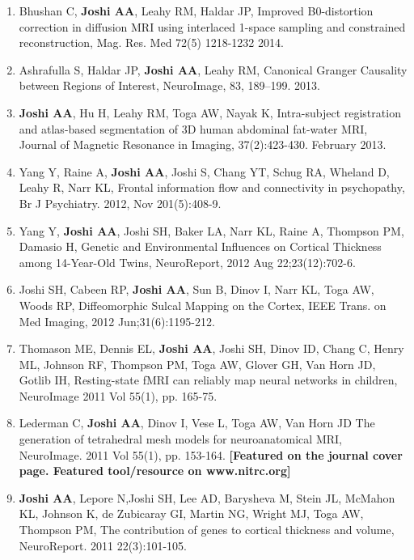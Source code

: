 \documentclass[overlapped,line,letterpaper]{res}
\begin{document}
\begin{resume}
\begin{enumerate}
    \item Bhushan C, \textbf{Joshi AA}, Leahy RM, Haldar JP, {Improved B0-distortion correction in diffusion MRI using interlaced 1-space sampling and constrained reconstruction}, Mag. Res. Med 72(5) 1218-1232 2014.

    \item Ashrafulla S, Haldar JP, \textbf{Joshi AA}, Leahy RM, {Canonical Granger Causality between Regions of Interest}, NeuroImage, 83, 189–199. 2013.

    \item \textbf{Joshi AA}, Hu H, Leahy RM, Toga AW, Nayak K, {Intra-subject registration and atlas-based segmentation of 3D human abdominal fat-water MRI}, Journal of Magnetic Resonance in Imaging,  37(2):423-430. February 2013.

    \item Yang Y, Raine A, \textbf{Joshi AA}, Joshi S, Chang YT, Schug RA, Wheland D, Leahy R, Narr KL, {Frontal information flow and connectivity in psychopathy}, Br J Psychiatry. 2012, Nov 201(5):408-9.

    \item Yang Y, \textbf{Joshi AA}, Joshi SH, Baker LA, Narr KL, Raine A, Thompson PM, Damasio H, {Genetic and Environmental Influences on Cortical Thickness among 14-Year-Old Twins}, NeuroReport, 2012 Aug 22;23(12):702-6.

    \item Joshi SH, Cabeen RP, \textbf{Joshi AA}, Sun B, Dinov I, Narr KL, Toga AW, Woods RP, {Diffeomorphic Sulcal Mapping on the Cortex}, IEEE Trans. on Med Imaging,  2012 Jun;31(6):1195-212.

    \item Thomason ME, Dennis EL, \textbf{Joshi AA}, Joshi SH, Dinov ID, Chang C, Henry ML, Johnson RF, Thompson PM, Toga AW, Glover GH, Van Horn JD, Gotlib IH, {Resting-state fMRI can reliably map neural networks in children}, NeuroImage 2011 Vol 55(1), pp. 165-75.

    \item Lederman C, \textbf{Joshi AA}, Dinov I, Vese L, Toga AW, Van Horn JD {The generation of tetrahedral mesh models for neuroanatomical MRI}, NeuroImage. 2011 Vol 55(1), pp. 153-164.  \textbf{[Featured on the journal cover page. Featured tool/resource on www.nitrc.org]}

    \item \textbf{Joshi AA}, Lepore N,Joshi SH, Lee AD, Barysheva M, Stein JL, McMahon KL, Johnson K, de Zubicaray GI, Martin NG, Wright MJ, Toga AW, Thompson PM, {The contribution of genes to cortical thickness and volume}, NeuroReport. 2011  22(3):101-105.


\end{enumerate}
\end{resume}
\end{document}
